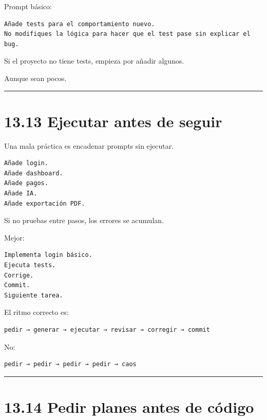 Prompt básico:

\begin{lstlisting}
Añade tests para el comportamiento nuevo.
No modifiques la lógica para hacer que el test pase sin explicar el bug.
\end{lstlisting}

Si el proyecto no tiene tests, empieza por añadir algunos.

Aunque sean pocos.

\begin{center}\rule{0.5\linewidth}{0.5pt}\end{center}

\section{13.13 Ejecutar antes de seguir}\label{ejecutar-antes-de-seguir}

Una mala práctica es encadenar prompts sin ejecutar.

\begin{lstlisting}
Añade login.
Añade dashboard.
Añade pagos.
Añade IA.
Añade exportación PDF.
\end{lstlisting}

Si no pruebas entre pasos, los errores se acumulan.

Mejor:

\begin{lstlisting}
Implementa login básico.
Ejecuta tests.
Corrige.
Commit.
Siguiente tarea.
\end{lstlisting}

El ritmo correcto es:

\begin{lstlisting}
pedir → generar → ejecutar → revisar → corregir → commit
\end{lstlisting}

No:

\begin{lstlisting}
pedir → pedir → pedir → pedir → caos
\end{lstlisting}

\begin{center}\rule{0.5\linewidth}{0.5pt}\end{center}

\section{13.14 Pedir planes antes de
código}\label{pedir-planes-antes-de-cuxf3digo}

